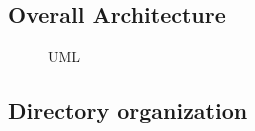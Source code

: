\documentclass[conference]{IEEEtran}
\begin{document}
\subsection{Overall Architecture}

\begin{figure}[h]
    \centering
    \caption{UML}
    \label{fig:Display}
\end{figure}
\clearpage

\subsection{Directory organization}
\end{document}
